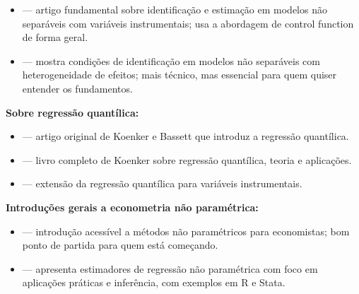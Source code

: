 \begin{itemize}
  \item \citet{imbens_identification_2009} — artigo fundamental sobre identificação
  e estimação em modelos não separáveis com variáveis instrumentais; usa a abordagem
  de control function de forma geral.
  \item \citet{chesher_identification_2003} — mostra condições de identificação em
  modelos não separáveis com heterogeneidade de efeitos; mais técnico, mas essencial
  para quem quiser entender os fundamentos.
\end{itemize}

\textbf{Sobre regressão quantílica:}

\begin{itemize}
  \item \citet{koenker_regression_1978} — artigo original de Koenker e Bassett que
  introduz a regressão quantílica.
  \item \citet{koenker_quantile_2005} — livro completo de Koenker sobre regressão
  quantílica, teoria e aplicações.
  \item \citet{chernozhukov_instrumental_2005} — extensão da regressão quantílica para
  variáveis instrumentais.
\end{itemize}

\textbf{Introduções gerais a econometria não paramétrica:}

\begin{itemize}
  \item \citet{pagan_nonparametric_1999} — introdução acessível a métodos não
  paramétricos para economistas; bom ponto de partida para quem está começando.
  \item \citet{cattaneo_simple_2020} — apresenta estimadores de regressão não
  paramétrica com foco em aplicações práticas e inferência, com exemplos em R e Stata.
\end{itemize}
